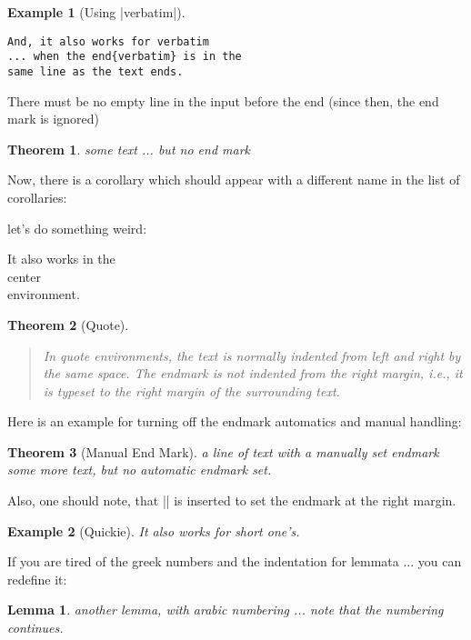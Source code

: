 \documentclass{article}
\theoremstyle{marginbreak}
\newtheorem{Theorem}{Theorem}
\theoremstyle{changebreak}
\newtheorem{Lemma}{Lemma}
\theoremstyle{change}
\newtheorem{Example}{Example}
\theoremstyle{plain}
\theoremstyle{nonumberplain}
\begin{document}
\begin{Example}[Using |verbatim|]
\begin{verbatim}
And, it also works for verbatim
... when the end{verbatim} is in the
same line as the text ends. \end{verbatim}
\end{Example}

There must be no empty line in the input before the end
(since then, the end mark is ignored) \\
\begin{Theorem}\label{ex-empty-line}
some text ... but no end mark

\end{Theorem}


Now, there is a corollary which should appear with a different
name in the list of corollaries:
\begin{Corollary*}\label{otherlabel}\ignorespaces
let's do something weird:
\begin{center}
   It also works in the \\
   center \\
   environment.  
\end{center}
\end{Corollary*}

\begin{Theorem}[Quote]
\begin{quote}
In quote environments, the text is normally indented from left 
and right by the same space. The endmark is not indented from the 
right margin, i.e., it is typeset to the right margin of the
surrounding text.
\end{quote}
\end{Theorem}

Here is an example for turning off the endmark automatics and
manual handling:
\begin{Theorem}[Manual End Mark]\label{somelabel}
a line of text with a manually set endmark \hfill\TheoremSymbol \\
some more text, but no automatic endmark set. \NoEndMark
\end{Theorem}
Also, one should note, that |\hfill| is inserted to set
the endmark at the right margin.

\begin{Example}[Quickie] It also works for short one's. 
\end{Example}

If you are tired of the greek numbers and the indentation for lemmata ... 
you can redefine it:
\theoremstyle{changebreak}
\theoremheaderfont{\normalfont\bfseries}\theorembodyfont{\slshape}
\theoremsymbol{\ensuremath{\heartsuit}}
\theoremsymbol{\ensuremath{\diamondsuit}}
\theoremseparator{:}
\begin{Lemma}
  another lemma, with arabic numbering ... note that the numbering
  continues.
\end{Lemma}
\end{document}
